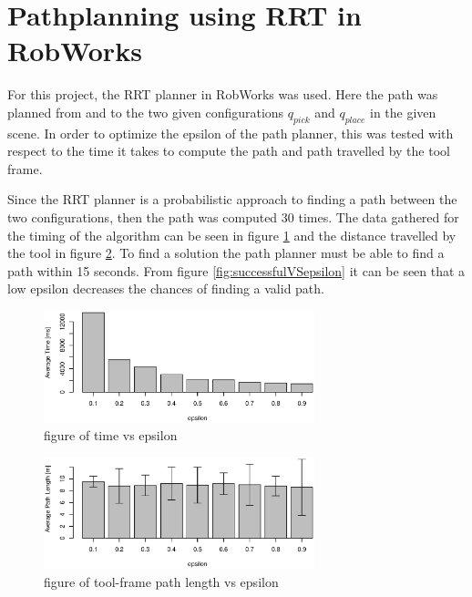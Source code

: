 \documentclass[12pt,a4paper]{article}
\begin{document}
\section{Pathplanning using RRT in RobWorks}
For this project, the RRT planner in RobWorks was used.
Here the path was planned from and to the two given configurations $q_{pick}$ and $q_{place}$ in the given scene.
In order to optimize the epsilon of the path planner, this was tested with respect to the time it takes to compute the path and path travelled by the tool frame.

Since the RRT planner is a probabilistic approach to finding a path between the two configurations, then the path was computed 30 times.
The data gathered for the timing of the algorithm can be seen in figure \ref{fig:timeVSepsilon} and the distance travelled by the tool in figure \ref{fig:distVSepsilon}.
To find a solution the path planner must be able to find a path within 15 seconds.
From figure \ref{fig:successfulVSepsilon} it can be seen that a low epsilon decreases the chances of finding a valid path.

\begin{figure}[H]
\centering
\includegraphics[width=0.7\textwidth]{../statistics/timeVSepsilon}
\caption{figure of time vs epsilon}
\label{fig:timeVSepsilon}
\end{figure}


\begin{figure}[H]
\centering
\includegraphics[width=0.7\textwidth]{../statistics/distVSepsilon}
\caption{figure of tool-frame path length vs epsilon}
\label{fig:distVSepsilon}
\end{figure}
\end{document}
